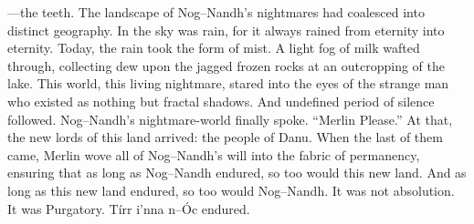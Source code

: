 \simpleline


\mbox{---}the teeth. The landscape of Nog\mbox{--}Nandh’s nightmares had coalesced into distinct geography. In the sky was rain, for it always rained from eternity into eternity. Today, the rain took the form of mist. A light fog of milk wafted through, collecting dew upon the jagged frozen rocks at an outcropping of the lake.
\SmallVSpace
This world, this living nightmare, stared into the eyes of the strange man who existed as nothing but fractal shadows. And undefined period of silence followed. Nog\mbox{--}Nandh’s nightmare-world finally spoke.
\SmallVSpace
“Merlin{\el} Please.”
\SmallVSpace
At that, the new lords of this land arrived: the people of Danu. When the last of them came, Merlin wove all of Nog\mbox{--}Nandh’s will into the fabric of permanency, ensuring that as long as Nog\mbox{--}Nandh endured, so too would this new land. And as long as this new land endured, so too would Nog\mbox{--}Nandh. It was not absolution. It was Purgatory.
\SomeVSpace
Tírr i’nna n\mbox{--}Óc endured.